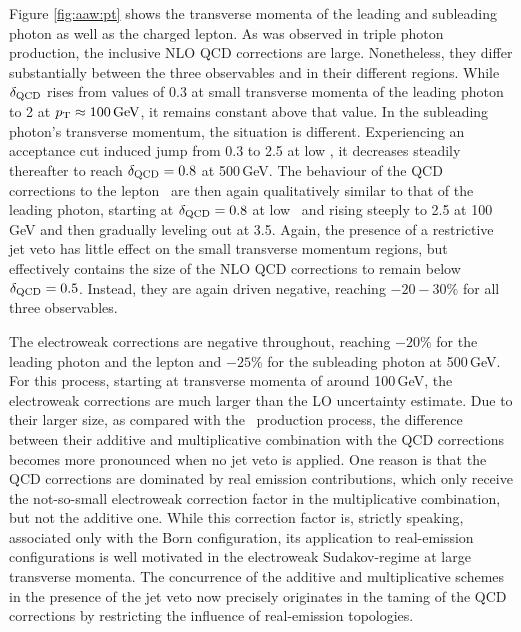 Figure \ref{fig:aaw:pt} shows the transverse momenta of 
the leading and subleading photon as well as the charged 
lepton. 
As was observed in triple photon production, the inclusive 
NLO QCD corrections are large. 
Nonetheless, they differ substantially between the three 
observables and in their different regions. 
While $\delta_\text{QCD}$ rises from values of 0.3 at small 
transverse momenta of the leading photon to 2 at 
$p_\text{T}\approx 100\,\text{GeV}$, it remains constant above that 
value.
In the subleading photon's transverse momentum, the 
situation is different. 
Experiencing an acceptance cut induced jump from 0.3 to 2.5 at low \pT, 
it decreases steadily thereafter to reach $\delta_\text{QCD}=0.8$ 
at 500\,GeV. 
The behaviour of the QCD corrections to the lepton \pT\ are 
then again qualitatively similar to that of the leading 
photon, starting at $\delta_\text{QCD}=0.8$ at low \pT \, and rising 
steeply to 2.5 at 100\,GeV and then gradually leveling out 
at 3.5. 
Again, the presence of a restrictive jet veto has little 
effect on the small transverse momentum regions, but 
effectively contains the size of the NLO QCD corrections 
to remain below $\delta_\text{QCD}=0.5$. 
Instead, they are again driven negative, reaching 
$-20-30\%$ for all three observables. 

The electroweak corrections are negative throughout, 
reaching $-20\%$ for the leading photon and the lepton 
and $-25\%$ for the subleading photon at 500\,GeV. 
For this process, starting at transverse momenta of 
around 100\,GeV, the electroweak corrections are much 
larger than the LO uncertainty estimate.
Due to their larger size, as compared with the \aaa\ 
production process, the difference between their 
additive and multiplicative combination with the 
QCD corrections becomes more pronounced when no 
jet veto is applied. 
One reason is that the QCD corrections are dominated 
by real emission contributions, which only receive the 
not-so-small electroweak correction factor in the 
multiplicative combination, but not the additive one. 
While this correction factor is, strictly speaking, 
associated only with the Born configuration, its 
application to real-emission configurations is well 
motivated in the electroweak Sudakov-regime at 
large transverse momenta. 
The concurrence of the additive and multiplicative 
schemes in the presence of the jet veto now precisely 
originates in the taming of the QCD corrections by 
restricting the influence of real-emission topologies. 

